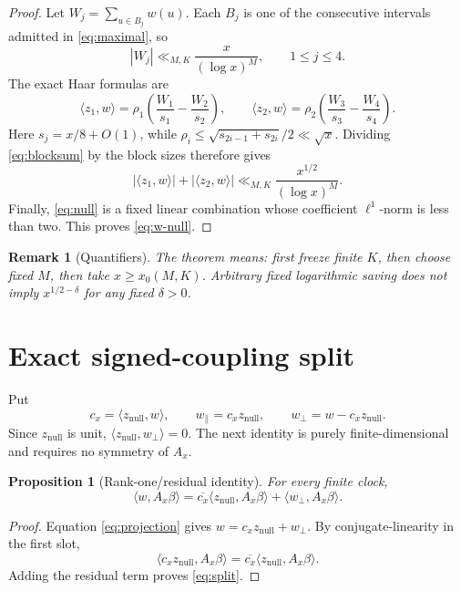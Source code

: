 \documentclass[10pt]{article}
\newtheorem{proposition}[theorem]{Proposition}
\newtheorem{remark}[theorem]{Remark}
\newcommand{\ip}[2]{\langle #1,#2\rangle}
\newcommand{\Ax}{A_x}
\newcommand{\znull}{z_{\mathrm{null}}}
\newcommand{\wperp}{w_{\perp}}
\begin{document}
\begin{proof}
Let \(W_j=\sum_{u\in B_j}w(u)\).  Each \(B_j\) is one of the consecutive
intervals admitted in \eqref{eq:maximal}, so
\begin{equation}
 |W_j|\ll_{M,K}\frac{x}{(\log x)^M},\qquad 1\le j\le4. \label{eq:blocksum}
\end{equation}
The exact Haar formulas are
\[
 \ip{z_1}{w}=\rho_1\left(\frac{W_1}{s_1}-\frac{W_2}{s_2}\right),
 \qquad
 \ip{z_2}{w}=\rho_2\left(\frac{W_3}{s_3}-\frac{W_4}{s_4}\right).
\]
Here \(s_j=x/8+O(1)\), while
\(\rho_i\le\sqrt{s_{2i-1}+s_{2i}}/2\ll\sqrt{x}\).  Dividing
\eqref{eq:blocksum} by the block sizes therefore gives
\[
 |\ip{z_1}{w}|+|\ip{z_2}{w}|
 \ll_{M,K}\frac{x^{1/2}}{(\log x)^M}.
\]
Finally, \eqref{eq:null} is a fixed linear combination whose coefficient
\(\ell^1\)-norm is less than two.  This proves \eqref{eq:w-null}.
\end{proof}

\begin{remark}[Quantifiers]
The theorem means: first freeze finite \(K\), then choose fixed \(M\), then
take \(x\ge x_0(M,K)\).  Arbitrary fixed logarithmic saving does not imply
\(x^{1/2-\delta}\) for any fixed \(\delta>0\).
\end{remark}

\section{Exact signed-coupling split}

Put
\begin{equation}
 c_x=\ip{\znull}{w},\qquad
 w_{\parallel}=c_x\znull,\qquad
 \wperp=w-c_x\znull.                                  \label{eq:projection}
\end{equation}
Since \(\znull\) is unit, \(\ip{\znull}{\wperp}=0\).  The next identity
is purely finite-dimensional and requires no symmetry of \(A_x\).

\begin{proposition}[Rank-one/residual identity]\label{prop:split}
For every finite clock,
\begin{equation}
 \boxed{\displaystyle
 \ip{w}{\Ax\beta}
 =\overline{c_x}\ip{\znull}{\Ax\beta}
  +\ip{\wperp}{\Ax\beta}.}                            \label{eq:split}
\end{equation}
\end{proposition}

\begin{proof}
Equation \eqref{eq:projection} gives \(w=c_x\znull+\wperp\).  By
conjugate-linearity in the first slot,
\[
 \ip{c_x\znull}{\Ax\beta}
 =\overline{c_x}\ip{\znull}{\Ax\beta}.
\]
Adding the residual term proves \eqref{eq:split}.
\end{proof}
\end{document}
